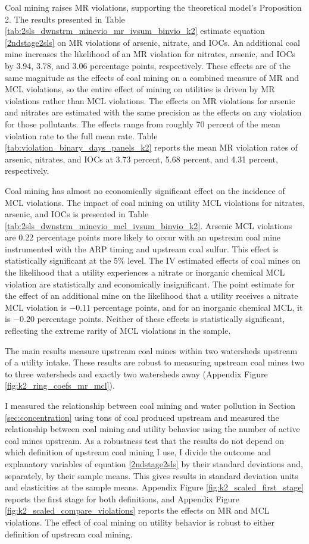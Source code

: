 \documentclass[12pt]{article}
\begin{document}
Coal mining raises MR violations, supporting the theoretical model's Proposition 2. The results presented in Table \ref{tab:2sls_dwnstrm_minevio_mr_ivsum_binvio_k2} estimate equation \ref{2ndstage2sls} on MR violations of arsenic, nitrate, and IOCs. An additional coal mine increases the likelihood of an MR violation for nitrates, arsenic, and IOCs by 3.94, 3.78, and 3.06 percentage points, respectively. These effects are of the same magnitude as the effects of coal mining on a combined measure of MR and MCL violations, so the entire effect of mining on utilities is driven by MR violations rather than MCL violations. The effects on MR violations for arsenic and nitrates are estimated with the same precision as the effects on any violation for those pollutants. The effects range from roughly 70 percent of the mean violation rate to the full mean rate. Table \ref{tab:violation_binary_days_panels_k2} reports the mean MR violation rates of arsenic, nitrates, and IOCs at 3.73 percent, 5.68 percent, and 4.31 percent, respectively.

Coal mining has almost no economically significant effect on the incidence of MCL violations. The impact of coal mining on utility MCL violations for nitrates, arsenic, and IOCs is presented in Table \ref{tab:2sls_dwnstrm_minevio_mcl_ivsum_binvio_k2}. Arsenic MCL violations are 0.22 percentage points more likely to occur with an upstream coal mine instrumented with the ARP timing and upstream coal sulfur. This effect is statistically significant at the 5\% level. The IV estimated effects of coal mines on the likelihood that a utility experiences a nitrate or inorganic chemical MCL violation are statistically and economically insignificant. The point estimate for the effect of an additional mine on the likelihood that a utility receives a nitrate MCL violation is $-0.11$ percentage points, and for an inorganic chemical MCL, it is $-0.20$ percentage points. Neither of these effects is statistically significant, reflecting the extreme rarity of MCL violations in the sample.

The main results measure upstream coal mines within two watersheds upstream of a utility intake. These results are robust to measuring upstream coal mines two to three watersheds and exactly two watersheds away (Appendix Figure \ref{fig:k2_ring_coefs_mr_mcl}).

I measured the relationship between coal mining and water pollution in Section \ref{sec:concentration} using tons of coal produced upstream and measured the relationship between coal mining and utility behavior using the number of active coal mines upstream. As a robustness test that the results do not depend on which definition of upstream coal mining I use, I divide the outcome and explanatory variables of equation \ref{2ndstage2sls} by their standard deviations and, separately, by their sample means. This gives results in standard deviation units and elasticities at the sample means. Appendix Figure \ref{fig:k2_scaled_first_stage} reports the first stage for both definitions, and Appendix Figure \ref{fig:k2_scaled_compare_violations} reports the effects on MR and MCL violations. The effect of coal mining on utility behavior is robust to either definition of upstream coal mining.
\end{document}
